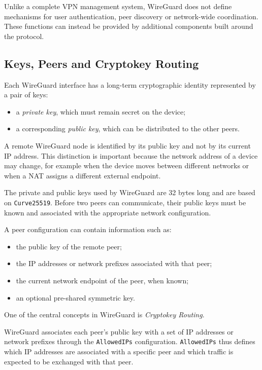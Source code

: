 Unlike a complete VPN management system, WireGuard does not define mechanisms for user authentication, peer discovery or network-wide coordination. These functions can instead be provided by additional components built around the protocol.

\subsection{Keys, Peers and Cryptokey Routing}

Each WireGuard interface has a long-term cryptographic identity represented by a pair of keys:
\begin{itemize}
	\item a \textit{private key}, which must remain secret on the device;
	\item a corresponding \textit{public key}, which can be distributed to the other peers.
\end{itemize}

A remote WireGuard node is identified by its public key and not by its current IP address. This distinction is important because the network address of a device may change, for example when the device moves between different networks or when a NAT assigns a different external endpoint.

The private and public keys used by WireGuard are 32 bytes long and are based on \texttt{Curve25519}. Before two peers can communicate, their public keys must be known and associated with the appropriate network configuration.

A peer configuration can contain information such as:
\begin{itemize}
	\item the public key of the remote peer;
	\item the IP addresses or network prefixes associated with that peer;
	\item the current network endpoint of the peer, when known;
	\item an optional pre-shared symmetric key.
\end{itemize}

One of the central concepts in WireGuard is \textit{Cryptokey Routing}.

WireGuard associates each peer's public key with a set of IP addresses or network prefixes through the \texttt{AllowedIPs} configuration. \texttt{AllowedIPs} thus defines which IP addresses are associated with a specific peer and which traffic is expected to be exchanged with that peer.

